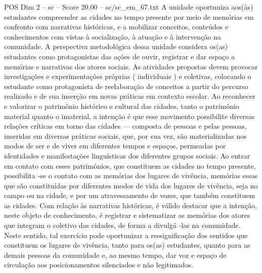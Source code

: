 \begin{textsample}{POS Dim 2 – sc – Score 20.00 – sc/sc\_em\_67.txt}
A unidade oportuniza aos(às) estudantes compreender as cidades no tempo presente por meio de memórias em confronto com narrativas históricas, e a mobilizar conceitos, conteúdos e conhecimentos com vistas à socialização, à atuação e à intervenção na comunidade.
A perspectiva metodológica dessa unidade considera os(as) estudantes como protagonistas das ações de ouvir, registrar e dar espaço a memórias e narrativas dos atores sociais.
As atividades propostas devem provocar investigações e experimentações próprias ( individuais ) e coletivas, colocando o estudante como protagonista de reelaboração de conceitos a partir do percurso realizado e de sua inserção em novas práticas em contexto escolar.
Ao reconhecer e valorizar o patrimônio histórico e cultural das cidades, tanto o patrimônio material quanto o imaterial, a intenção é que esse movimento possibilite diversas relações críticas em torno das cidades — composta de pessoas e pelas pessoas, inseridas em diversas práticas sociais, que, por sua vez, são materializadas nos modos de ser e de viver em diferentes tempos e espaços, permeadas por identidades e manifestações linguísticas dos diferentes grupos sociais.
Ao entrar em contato com esses patrimônios, que constituem as cidades no tempo presente, possibilita -se o contato com as memórias dos lugares de vivência, memórias essas que são constituídas por diferentes modos de vida dos lugares de vivência, seja no campo ou na cidade, e por um atravessamento de vozes, que também constituem as cidades.
Com relação às narrativas históricas, é válido destacar que a intenção, neste objeto de conhecimento, é registrar e sistematizar as memórias dos atores que integram o coletivo das cidades, de forma a divulgá -las na comunidade.
Neste sentido, tal exercício pode oportunizar a ressignificação dos sentidos que constituem os lugares de vivência, tanto para os(as) estudantes, quanto para as demais pessoas da comunidade e, ao mesmo tempo, dar voz e espaço de circulação aos posicionamentos silenciados e não legitimados.

\end{textsample}
